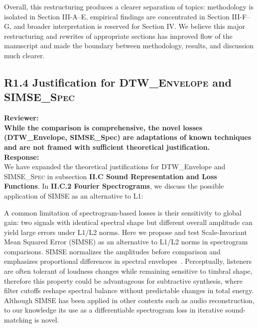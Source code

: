 \documentclass[11pt]{article}
\newcommand{\DTWEnv}{\textsc{DTW\_Envelope}}
\newcommand{\SIMSESpec}{\textsc{SIMSE\_Spec}}
\begin{document}
Overall, this restructuring produces a clearer separation of topics: methodology is isolated in Section III-A–E, empirical findings are concentrated in Section III-F–G, and broader interpretation is reserved for Section IV. We believe this major restructuring and rewrites of appropriate sections has improved flow of the manuscript and made the boundary between methodology, results, and discussion much clearer.

\subsection*{R1.4 Justification for \DTWEnv{} and \SIMSESpec}
\label{R1.4}
\noindent\textbf{Reviewer:} \\
\textbf{\noindent While the comparison is comprehensive, the novel losses (DTW\_Envelope, SIMSE\_Spec) are adaptations of known techniques and are not framed with sufficient theoretical justification. }\\

\noindent\textbf{Response:} \\
We have expanded the theoretical justifications for DTW\_Envelope and \SIMSESpec{} in subsection \textbf{II.C Sound Representation and Loss Functions}. In \textbf{II.C.2 Fourier Spectrograms}, we discuss the possible application of SIMSE as an alternative to L1:
\begin{displayquote}
    A common limitation of spectrogram-based losses is their sensitivity to global gain: two signals with identical spectral shape but different overall amplitude can yield large errors under L1/L2 norms. 
    Here we propose and test Scale-Invariant Mean Squared Error (SIMSE) as an alternative to L1/L2 norms in spectrogram comparisons. SIMSE normalizes the amplitudes before comparison and emphasizes proportional differences in spectral envelopes~\cite{barron2014shapessimse}. 
    Perceptually, listeners are often tolerant of loudness changes while remaining sensitive to timbral shape, therefore this property could be advantageous for subtractive synthesis, where filter cutoffs reshape spectral balance without predictable changes in total energy. Although SIMSE has been applied in other contexts such as audio reconstruction, to our knowledge its use as a differentiable spectrogram loss in iterative sound-matching is novel.
\end{displayquote}
\end{document}
